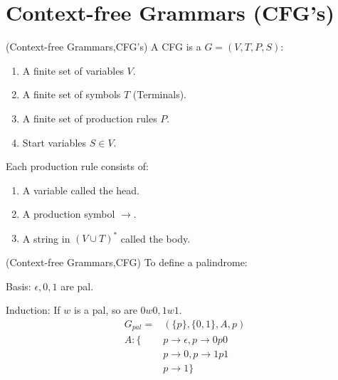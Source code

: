 
\usepackage{../../lectures_preamble}


    \section{Context-free Grammars (CFG's)}
        \begin{definition}
            (Context-free Grammars,CFG's) A CFG is a $G=(V,T,P,S)$:
            \begin{enumerate}
                \item A finite set of variables $V$.
                \item A finite set of symbols $T$ (Terminals).
                \item A finite set of production rules $P$.
                \item Start variables $S\in V$.
            \end{enumerate}
            Each production rule consists of:
            \begin{enumerate}
                \item A variable called the head.
                \item A production symbol $\rightarrow $.
                \item A string in $(V\cup T)^{*}$ called the body.
            \end{enumerate}
        \end{definition}
        
        \begin{example}
            (Context-free Grammars,CFG) To define a palindrome:

            Basis: $\epsilon,0,1$ are pal.

            Induction: If $w$ is a pal, so are $0w 0,1w 1$.
            \begin{align}
                G_{pal}=&(\{p\},\{0,1\},A,p)\nonumber\\
                A:\{&p\rightarrow \epsilon,p\rightarrow 0p0\nonumber\\
                  &p\rightarrow 0,p\rightarrow 1p1\nonumber\\
                  &p\rightarrow 1\}\nonumber
            \end{align}
        \end{example}
